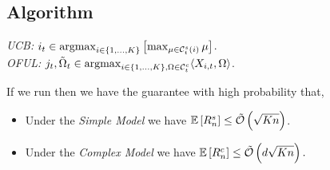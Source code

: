 \subsection{Algorithm} 

\begin{algorithm}
\label{algorithm:OFULER}
\caption{\algname}
 {
    \textit{UCB: } $i_t \in \argmax_{\iinrange{1}{K}} \left[\max_{\mu \in \mathcal{C}_t^{s}(i)} \mu\right]$. \\
    
    \textit{OFUL: }$j_t,\tilde{\Omega}_t \in \argmax_{\iinrange{1}{K}, \Omega \in \mathcal{C}_t^c} \langle X_{i,t},\Omega \rangle$. \\

        
}

\end{algorithm}



\begin{theorem}\label{thm:mainregretbound}
If we run \algname then we have the guarantee with high probability that,
\begin{itemize}
    \item Under the \emph{Simple Model} we have $\mathbb{E}\left[R^s_{n}\right] \le \tilde{\mathcal{O}}\left(\sqrt{K n}\right)$.
    \item Under the \emph{Complex Model} we have $\mathbb{E}\left[R^c_{n}\right] \le \tilde{\mathcal{O}}\left(d\sqrt{K n}\right).$
\end{itemize}
\end{theorem}

